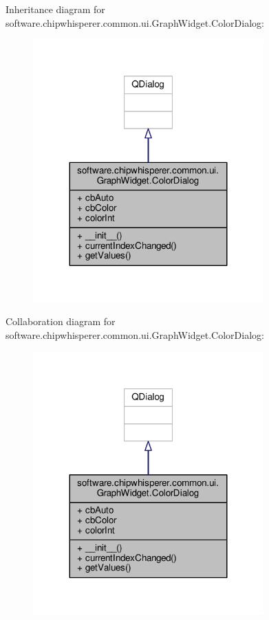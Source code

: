 Inheritance diagram for software.\+chipwhisperer.\+common.\+ui.\+Graph\+Widget.\+Color\+Dialog\+:\nopagebreak
\begin{figure}[H]
\begin{center}
\leavevmode
\includegraphics[width=251pt]{d4/de5/classsoftware_1_1chipwhisperer_1_1common_1_1ui_1_1GraphWidget_1_1ColorDialog__inherit__graph}
\end{center}
\end{figure}


Collaboration diagram for software.\+chipwhisperer.\+common.\+ui.\+Graph\+Widget.\+Color\+Dialog\+:\nopagebreak
\begin{figure}[H]
\begin{center}
\leavevmode
\includegraphics[width=251pt]{d4/d8b/classsoftware_1_1chipwhisperer_1_1common_1_1ui_1_1GraphWidget_1_1ColorDialog__coll__graph}
\end{center}
\end{figure}


